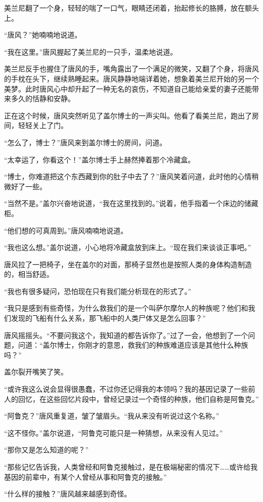 美兰尼翻了一个身，轻轻的喘了一口气，眼睛还闭着，抬起修长的胳膊，放在额头上。

“唐风？”她喃喃地说道。

“我在这里。”唐风握起了美兰尼的一只手，温柔地说道。

美兰尼反手也握住了唐风的手，嘴角露出了一个满足的微笑，又翻了个身，将唐风的手枕在头下，继续熟睡起来。唐风静静地端详着她，想象着美兰尼开始的另一个美梦。此时唐风心中却升起了一种无名的哀伤，不知道自己能给亲爱的妻子还能带来多久的恬静和安静。

正在这个时候，唐风突然听见了盖尔博士的一声尖叫。他看了看美兰尼，跑出了房间，轻轻关上了门。

“怎么了，博士？”唐风来到盖尔博士的房间，问道。

“太幸运了，你看这个！”盖尔博士手上赫然捧着那个冷藏盒。

“博士，你难道把这个东西藏到你的肚子中去了？”唐风笑着问道，此时他的心情稍微好了一些。

“当然不是。”盖尔兴奋地说道，“我在这里找到的。”说着，他手指着一个床边的储藏柜。

“他们想的可真周到。”唐风喃喃地说道。

“我也这么想。”盖尔说道，小心地将冷藏盒放到床上。“现在我们来谈谈正事吧。”

唐风拉了一把椅子，坐在盖尔的对面，那椅子显然也是按照人类的身体构造制造的，相当舒适。

“我也有很多疑问，恐怕现在只有我们能分析现在的形式了。”

“我只是感到有些奇怪，为什么救我们的是一个叫萨尔摩尔人的种族呢？他们和我们发现的飞船有什么关系，那飞船中的人类尸体又是怎么回事？”

唐风摇摇头。“不要问我这个，我知道的都告诉你了。”过了一会，他想到了一个问题，问道：“盖尔博士，你刚才的意思，救我们的种族难道应该是其他什么种族吗？”

盖尔裂开嘴笑了笑。

“或许我这么说会显得很愚蠢，不过你还记得我的本领吗？我的基因记录了一些前人的回忆，在这些回忆片段中，曾经记录过一个奇怪的种族，他们自称是阿鲁克。”

“阿鲁克？”唐风重复道，皱了皱眉头。“我从来没有听说过这个名称。”

“这不怪你。”盖尔说道，“阿鲁克可能只是一种猜想，从来没有人见过。”

“那你又是怎么知道的呢？”

“那些记忆告诉我，人类曾经和阿鲁克接触过，是在极端秘密的情况下……或许给我基因的前辈中，有某个人曾经从事和阿鲁克的接触。”

“什么样的接触？”唐风越来越感到奇怪。

